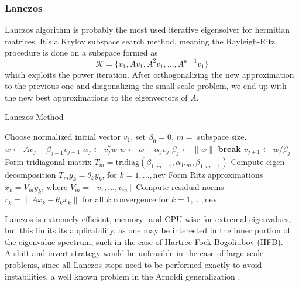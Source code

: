 \subsubsection{Lanczos}
Lanczos algorithm \cite{lanczos1952solution} is probably the most used iterative eigensolver for hermitian matrices. It's a Krylov subspace search method, meaning the Rayleigh-Ritz procedure is done on a subspace formed as 
\begin{equation}
    \mathcal K = \{ v_1, Av_1, A^2 v_1, \ldots, A^{k-1} v_1 \}
\end{equation}
which exploits the power iteration. After orthogonalizing the new approximation to the previous one and diagonalizing the small scale problem, we end up with the new best approximations to the eigenvectors of $A$.
\begin{algorithm}[h]
\caption{Lanczos Method}
\begin{algorithmic}[1]
\STATE Choose normalized initial vector $v_1$, set $\beta_0 = 0$, $m=$ subspace size.
\REPEAT
{}
    \STATE $w \gets A v_j - \beta_{j-1} v_{j-1}$
    \STATE $\alpha_j \gets v_j^* w$
    \STATE $w \gets w - \alpha_j v_j$
    \STATE $\beta_j \gets \|w\|$
        \STATE \textbf{break}
    \ENDIF
    \STATE $v_{j+1} \gets w / \beta_j$
\ENDFOR
\STATE Form tridiagonal matrix 
       $T_m = \mathrm{tridiag}(\beta_{1:m-1}, \alpha_{1:m}, \beta_{1:m-1})$
\STATE Compute eigen-decomposition $T_m y_k = \theta_k y_k$, 
       for $k = 1, \dots, \text{nev}$
\STATE Form Ritz approximations 
       $x_k = V_m y_k$, where $V_m = [v_1, \dots, v_m]$
\STATE Compute residual norms 
       $r_k = \|A x_k - \theta_k x_k\|$ for all $k$
\UNTIL convergence for $k = 1, \dots, \text{nev}$
\end{algorithmic}
\end{algorithm}
Lanczos is extremely efficient, memory- and CPU-wise for extremal eigenvalues, but this limits its applicability, as one may be interested in the inner portion of the eigenvalue spectrum, such in the case of Hartree-Fock-Bogoliubov (HFB).
\\A shift-and-invert strategy would be unfeasible in the case of large scale problems, since all Lanczos steps need to be performed exactly to avoid instabilities, a well known problem in the Arnoldi generalization \cite{Saad1992}.
